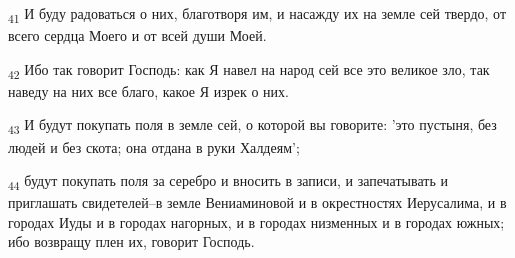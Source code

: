 \begin{tcolorbox}
\textsubscript{41} И буду радоваться о них, благотворя им, и насажду их на земле сей твердо, от всего сердца Моего и от всей души Моей.
\end{tcolorbox}
\begin{tcolorbox}
\textsubscript{42} Ибо так говорит Господь: как Я навел на народ сей все это великое зло, так наведу на них все благо, какое Я изрек о них.
\end{tcolorbox}
\begin{tcolorbox}
\textsubscript{43} И будут покупать поля в земле сей, о которой вы говорите: 'это пустыня, без людей и без скота; она отдана в руки Халдеям';
\end{tcolorbox}
\begin{tcolorbox}
\textsubscript{44} будут покупать поля за серебро и вносить в записи, и запечатывать и приглашать свидетелей--в земле Вениаминовой и в окрестностях Иерусалима, и в городах Иуды и в городах нагорных, и в городах низменных и в городах южных; ибо возвращу плен их, говорит Господь.
\end{tcolorbox}

